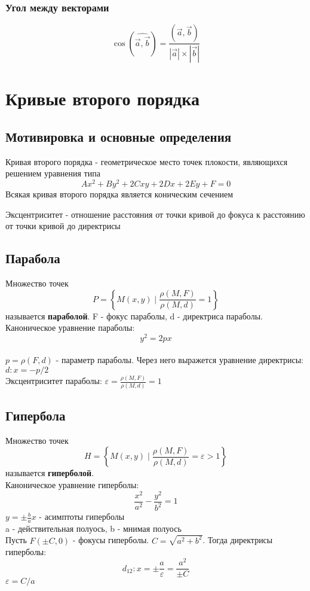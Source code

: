 \subsubsection{Угол между векторами}
$$\boxed{\cos{(\widehat{\Vec{a},\Vec{b}})}=\frac{(\Vec{a},
\Vec{b})}{|\Vec{a}|\times|\Vec{b}|}}$$



\section{Кривые второго порядка}
\subsection{Мотивировка и основные определения}
Кривая второго порядка - геометрическое место точек плокости, являющихся
решением уравнения типа $$Ax^2+By^2+2Cxy+2Dx+2Ey+F=0$$
Всякая кривая второго порядка является коническим сечением
\begin{defin}
Эксцентриситет - отношение расстояния от точки кривой до фокуса к расстоянию
от точки кривой до директрисы
\end{defin}


\subsection{Парабола}
Множество точек $$P=\left\{ M(x,y)\mid \frac{\rho(M,F)}{\rho(M,d)}=1 \right\}$$
называется \textbf{параболой}. F - фокус параболы, d - директриса параболы.\\
Каноническое уравнение параболы: $$\boxed{y^2=2px}$$\\
$p=\rho(F,d)$ - параметр параболы. Через него выражется уравнение директрисы:
$d\colon x=-p/2$\\
Эксцентриситет параболы: $\varepsilon=\frac{\rho(M,F)}{\rho(M,d)}=1$

\subsection{Гипербола}
Множество точек 
$$H=\left\{ M(x,y)\mid \frac{\rho(M,F)}{\rho(M,d)}=\varepsilon>1 
\right\} $$ называется \textbf{гиперболой}.\\
Каноническое уравнение гиперболы:
$$\boxed{\frac{x^2}{a^2}-\frac{y^2}{b^2}=1}$$
$y=\pm\frac{b}{a}x$ - асимптоты гиперболы\\
a - действительная полуось, b - мнимая полуось\\
Пусть $F(\pm C,0)$ - фокусы гиперболы. $C=\sqrt{a^2+b^2}$. 
Тогда директрисы гиперболы: $$d_{12}\colon x=\pm\frac{a}{\varepsilon}=
\frac{a^2}{\pm C}$$ $\varepsilon=C/a$



